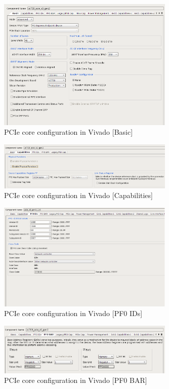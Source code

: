 \begin{figure}[H]
\centering
\includegraphics[width=0.75\textwidth]{pictures/pcie_core_basic.png}
\caption{PCIe core configuration in Vivado [Basic]}
\label{fig:pcie_core_config1}
\end{figure}

\begin{figure}[H]
\centering
\includegraphics[width=0.75\textwidth]{pictures/pcie_core_config2.pdf}
\caption{PCIe core configuration in Vivado [Capabilities]}
\label{fig:pcie_core_config2}
\end{figure}

\begin{figure}[H]
\centering
\includegraphics[width=0.75\textwidth]{pictures/pcie_core_config3.pdf}
\caption{PCIe core configuration in Vivado [PF0 IDs]}
\label{fig:pcie_core_config3}
\end{figure}
\newpage
\begin{figure}[H]
\centering
\includegraphics[width=0.75\textwidth]{pictures/pcie_core_pf0_bar.png}
\caption{PCIe core configuration in Vivado [PF0 BAR]}
\label{fig:pcie_core_config4}
\end{figure}


